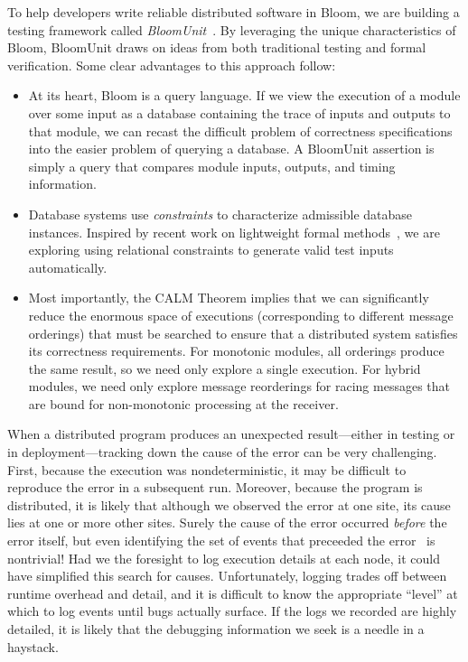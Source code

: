 To help developers write reliable distributed software in Bloom, we are building
a testing framework called \emph{BloomUnit}~\cite{Alvaro2012}. By leveraging the
unique characteristics of Bloom, BloomUnit draws on ideas from both traditional
testing and formal verification. Some clear advantages to this approach follow:

\begin{itemize}
\item
  At its heart, Bloom is a query language.  If we view the execution of a module
  over some input as a database containing the trace of inputs and outputs to
  that module, we can recast the difficult problem of correctness specifications
  into the easier problem of querying a database. A BloomUnit assertion is
  simply a query that compares module inputs, outputs, and timing information.

\item
  Database systems use \emph{constraints} to characterize admissible database
  instances.  Inspired by recent work on lightweight formal
  methods~\cite{Jackson2012}, we are exploring using relational constraints to
  generate valid test inputs automatically.

\item
  Most importantly, the CALM Theorem implies that we can significantly reduce
  the enormous space of executions (corresponding to different message
  orderings) that must be searched to ensure that a distributed system satisfies
  its correctness requirements.  For monotonic modules, all orderings produce
  the same result, so we need only explore a single execution.  For hybrid
  modules, we need only explore message reorderings for racing messages that are
  bound for non-monotonic processing at the receiver.
\end{itemize}

When a distributed program produces an unexpected result---either in testing or in
deployment---tracking down the cause of the error can be very challenging.  First, because
the execution was nondeterministic, it may be difficult to reproduce the error in a subsequent
run.  Moreover, because the program is distributed, it is likely that although we observed the 
error at one site, its cause lies at one or more other sites.  Surely the cause of the error
occurred \emph{before} the error itself, but even identifying the set of events that preceeded the 
error~\cite{timeclocks} is nontrivial!  Had we the foresight to log execution details at each node,
it could have simplified this search for causes.  Unfortunately, logging trades off between 
runtime overhead and detail, and it is difficult to know the appropriate ``level'' at which to
log events until bugs actually surface.  If the logs we recorded are highly detailed, it is likely
that the debugging information we seek is a needle in a haystack.

